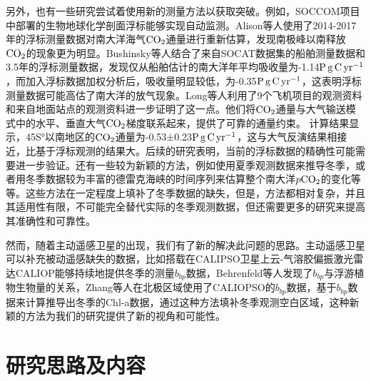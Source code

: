 另外，也有一些研究尝试着使用新的测量方法以获取突破。例如，SOCCOM项目中部署的生物地球化学剖面浮标能够实现自动监测。Alison等人\cite{gray2018autonomous}使用了2014-2017年的浮标测量数据对南大洋海气$\rm CO_2$通量进行重新估算，发现南极峰以南释放$\rm CO_2$的现象更为明显。Bushinsky等人\cite{bushinsky2019reassessing}结合了来自SOCAT数据集的船舶测量数据和3.5年的浮标测量数据，发现仅从船舶估计的南大洋年平均吸收量为-1.14$\rm P \, g \, C \, yr^{-1}$，而加入浮标数据加权分析后，吸收量明显较低，为-0.35$\rm P \, g \, C \, yr^{-1}$，这表明浮标测量数据可能高估了南大洋的放气现象。Long等人\cite{long2021strong}利用了9个飞机项目的观测资料和来自地面站点的观测资料进一步证明了这一点。他们将$\rm CO_2$通量与大气输送模式中的水平、垂直大气$\rm CO_2$梯度联系起来，提供了可靠的通量约束。 计算结果显示，45S°以南地区的$\rm CO_2$通量为-0.53±0.23$\rm P\, g\, C\, yr^{-1}$，这与大气反演结果相接近，比基于浮标观测的结果大。后续的研究\cite{wu2023controversial}表明，当前的浮标数据的精确性可能需要进一步验证。还有一些较为新颖的方法，例如使用夏季观测数据来推导冬季\cite{mackay2022improved}，或者用冬季数据较为丰富的德雷克海峡的时间序列来估算整个南大洋$p\rm CO_2$的变化\cite{fay2018utilizing}等等。这些方法在一定程度上填补了冬季数据的缺失，但是，方法都相对复杂，并且其适用性有限，不可能完全替代实际的冬季观测数据，但还需要更多的研究来提高其准确性和可靠性。

然而，随着主动遥感卫星的出现，我们有了新的解决此问题的思路。主动遥感卫星可以补充被动遥感缺失的数据，比如搭载在CALIPSO卫星上云-气溶胶偏振激光雷达CALIOP能够持续地提供冬季的测量$b_{bp}$数据，Behrenfeld等人\cite{bbp_Annual_2017}发现了$b_{bp}$与浮游植物生物量的关系，Zhang等人\cite{zhang2022carbon}在北极区域使用了CALIOPSO的$b_{bp}$数据，基于$b_{bp}$数据来计算推导出冬季的Chl-a数据，通过这种方法填补冬季观测空白区域，这种新颖的方法为我们的研究提供了新的视角和可能性。
\section{研究思路及内容}
